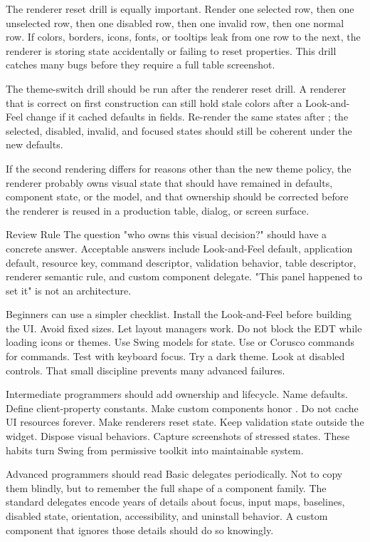 The renderer reset drill is equally important. Render one selected row, then one unselected row, then one disabled row, then one invalid row, then one normal row. If colors, borders, icons, fonts, or tooltips leak from one row to the next, the renderer is storing state accidentally or failing to reset properties. This drill catches many bugs before they require a full table screenshot.

The theme-switch drill should be run after the renderer reset drill. A renderer that is correct on first construction can still hold stale colors after a Look-and-Feel change if it cached defaults in fields. Re-render the same states after ; the selected, disabled, invalid, and focused states should still be coherent under the new defaults.

If the second rendering differs for reasons other than the new theme policy, the renderer probably owns visual state that should have remained in defaults, component state, or the model, and that ownership should be corrected before the renderer is reused in a production table, dialog, or screen surface.

\begin{detailbox}{Review Rule}
The question "who owns this visual decision?" should have a concrete answer. Acceptable answers include Look-and-Feel default, application default, resource key, command descriptor, validation behavior, table descriptor, renderer semantic rule, and custom component delegate. "This panel happened to set it" is not an architecture.
\end{detailbox}

Beginners can use a simpler checklist. Install the Look-and-Feel before building the UI. Avoid fixed sizes. Let layout managers work. Do not block the EDT while loading icons or themes. Use Swing models for state. Use  or Corusco commands for commands. Test with keyboard focus. Try a dark theme. Look at disabled controls. That small discipline prevents many advanced failures.

Intermediate programmers should add ownership and lifecycle. Name defaults. Define client-property constants. Make custom components honor . Do not cache UI resources forever. Make renderers reset state. Keep validation state outside the widget. Dispose visual behaviors. Capture screenshots of stressed states. These habits turn Swing from permissive toolkit into maintainable system.

Advanced programmers should read Basic delegates periodically. Not to copy them blindly, but to remember the full shape of a component family. The standard delegates encode years of details about focus, input maps, baselines, disabled state, orientation, accessibility, and uninstall behavior. A custom component that ignores those details should do so knowingly.

